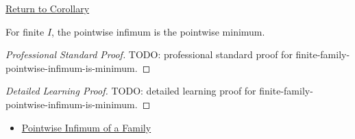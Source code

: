 \newpage
{}
\label{prf:finite-family-pointwise-infimum-is-minimum}

\begin{remark*}[Return]
\hyperref[cor:finite-family-pointwise-infimum-is-minimum]{Return to Corollary}
\end{remark*}

\begin{corollary*}
For finite \(I\), the pointwise infimum is the pointwise minimum.
\end{corollary*}

\begin{proof}[Professional Standard Proof]
\LRAProofBodyStart
TODO: professional standard proof for finite-family-pointwise-infimum-is-minimum.
\end{proof}

\begin{proof}[Detailed Learning Proof]
\LRAProofBodyStart
TODO: detailed learning proof for finite-family-pointwise-infimum-is-minimum.
\end{proof}

\begin{remark*}
\end{remark*}

\begin{dependencies}
\begin{itemize}
  \item \hyperref[def:pointwise-infimum-family]{Pointwise Infimum of a Family}
\end{itemize}
\end{dependencies}

\clearpage
